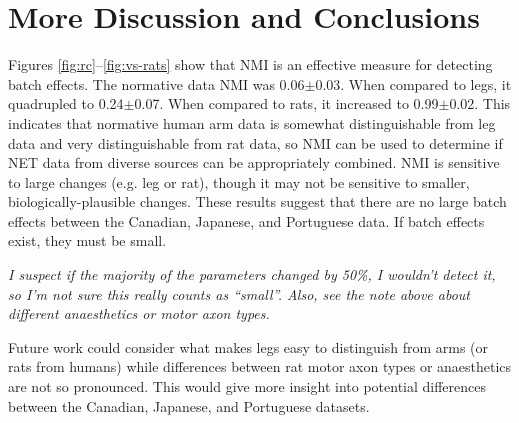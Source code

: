 \documentclass[12pt]{article}
\begin{document}
\section*{More Discussion and Conclusions}

Figures \ref{fig:rc}–\ref{fig:vs-rats} show that NMI is an effective measure for detecting batch effects. The normative data NMI was 0.06$\pm$0.03. When compared to legs, it quadrupled to 0.24$\pm$0.07. When compared to rats, it increased to 0.99$\pm$0.02. This indicates that normative human arm data is somewhat distinguishable from leg data and very distinguishable from rat data, so NMI can be used to determine if NET data from diverse sources can be appropriately combined. NMI is sensitive to large changes (e.g. leg or rat), though it may not be sensitive to smaller, biologically-plausible changes. These results suggest that there are no large batch effects between the Canadian, Japanese, and Portuguese data. If batch effects exist, they must be small.

\emph{I suspect if the majority of the parameters changed by 50\%, I wouldn't detect it, so I'm not sure this really counts as ``small''. Also, see the note above about different anaesthetics or motor axon types.}

Future work could consider what makes legs easy to distinguish from arms (or rats from humans) while differences between rat motor axon types or anaesthetics are not so pronounced. This would give more insight into potential differences between the Canadian, Japanese, and Portuguese datasets.
\end{document}
